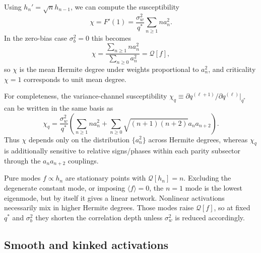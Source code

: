 \documentclass{article}
\theoremstyle{plain}
\theoremstyle{definition}
\theoremstyle{remark}
\begin{document}
Using $h_n'=\sqrt{n} h_{n-1}$, we can compute the susceptibility
\relax
\begin{equation}
\chi = F'(1) = \frac{\sigma_w^2}{q^*}\sum_{n\ge 1} n a_n^2 .
\end{equation}
\relax
In the zero-bias case $\sigma_b^2=0$ this becomes
\relax
\begin{equation}
\chi=\frac{\sum_{n\ge 1} n a_n^2}{\sum_{n\ge 0} a_n^2}=\mathcal{Q}[f],
\end{equation}
\relax
so $\chi$ is the mean Hermite degree under weights proportional to $a_n^2$, and criticality $\chi=1$ corresponds to unit mean degree.

For completeness, the variance-channel susceptibility $\chi_q \equiv \partial q^{(\ell+1)}/\partial q^{(\ell)}|_{q^*}$ can be written in the same basis as
\relax
\begin{equation}
\chi_q = \frac{\sigma_w^2}{q^*} \left( \sum_{n\ge 1} n a_n^2 + \sum_{n\ge 0}\sqrt{(n+1)(n+2)} a_n a_{n+2} \right).
\end{equation}
\relax
Thus $\chi$ depends only on the distribution $\{a_n^2\}$ across Hermite degrees, whereas $\chi_q$ is additionally sensitive to relative signs/phases within each parity subsector through the $a_n a_{n+2}$ couplings.

Pure modes $f\propto h_n$ are stationary points with $\mathcal{Q}[h_n]=n$. Excluding the degenerate constant mode, or imposing \(\langle f\rangle=0\), the $n=1$ mode is the lowest eigenmode, but by itself it gives a linear network. Nonlinear activations necessarily mix in higher Hermite degrees. Those modes raise $\mathcal{Q}[f]$, so at fixed \(q^*\) and \(\sigma_b^2\) they shorten the correlation depth unless $\sigma_w^2$ is reduced accordingly.










\subsection{Smooth and kinked activations}
\end{document}
